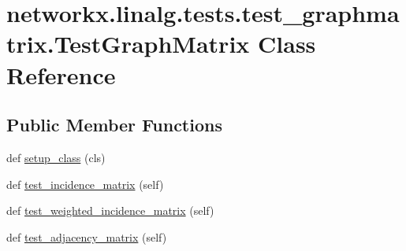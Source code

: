 \hypertarget{classnetworkx_1_1linalg_1_1tests_1_1test__graphmatrix_1_1TestGraphMatrix}{}\section{networkx.\+linalg.\+tests.\+test\+\_\+graphmatrix.\+Test\+Graph\+Matrix Class Reference}
\label{classnetworkx_1_1linalg_1_1tests_1_1test__graphmatrix_1_1TestGraphMatrix}
\subsection*{Public Member Functions}
\begin{DoxyCompactItemize}
\item 
def \hyperlink{classnetworkx_1_1linalg_1_1tests_1_1test__graphmatrix_1_1TestGraphMatrix_ac0e14177b3f6cdd8d5eb6391e5b853b8}{setup\+\_\+class} (cls)
\item 
def \hyperlink{classnetworkx_1_1linalg_1_1tests_1_1test__graphmatrix_1_1TestGraphMatrix_a930accebefca41de937218a325fa78db}{test\+\_\+incidence\+\_\+matrix} (self)
\item 
def \hyperlink{classnetworkx_1_1linalg_1_1tests_1_1test__graphmatrix_1_1TestGraphMatrix_ac4fe2cf1065f633676ecbb982d358431}{test\+\_\+weighted\+\_\+incidence\+\_\+matrix} (self)
\item 
def \hyperlink{classnetworkx_1_1linalg_1_1tests_1_1test__graphmatrix_1_1TestGraphMatrix_a891d6a079fd73ca70ad79d2484506ada}{test\+\_\+adjacency\+\_\+matrix} (self)
\end{DoxyCompactItemize}
